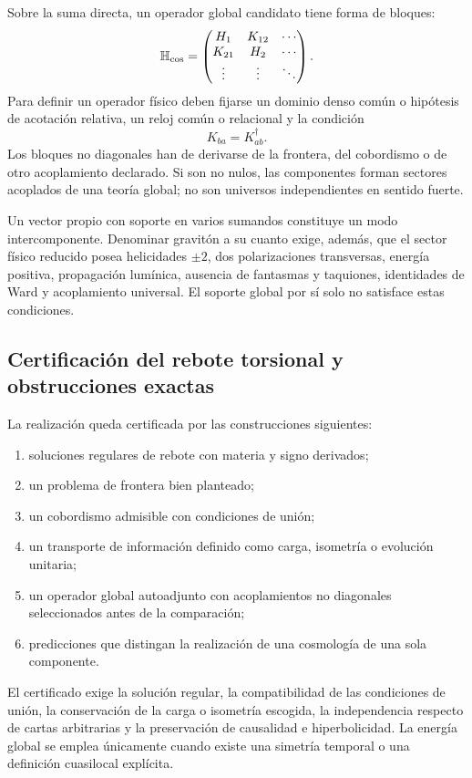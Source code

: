 Sobre la suma directa, un operador global candidato tiene forma de bloques:
\[
 \mathbb H_{\rm cos}
 =
 \begin{pmatrix}
 H_1&K_{12}&\cdots\\
 K_{21}&H_2&\cdots\\
 \vdots&\vdots&\ddots
 \end{pmatrix}.
\]
Para definir un operador físico deben fijarse un dominio denso común o
hipótesis de acotación relativa, un reloj común o relacional y la condición
\[
 K_{ba}=K_{ab}^{\dagger}.
\]
Los bloques no diagonales han de derivarse de la frontera, del cobordismo o
de otro acoplamiento declarado. Si son no nulos, las componentes forman
sectores acoplados de una teoría global; no son universos independientes en
sentido fuerte.

Un vector propio con soporte en varios sumandos constituye un modo
intercomponente. Denominar gravitón a su cuanto exige, además, que el sector
físico reducido posea helicidades \(\pm2\), dos polarizaciones transversas,
energía positiva, propagación lumínica, ausencia de fantasmas y taquiones,
identidades de Ward y acoplamiento universal. El soporte global por sí solo
no satisface estas condiciones.

\subsection{Certificación del rebote torsional y obstrucciones exactas}
\label{sec:condiciones-prueba-cosmologia-hmt}

La realización queda certificada por las construcciones siguientes:
\begin{enumerate}
 \item soluciones regulares de rebote con materia y signo derivados;
 \item un problema de frontera bien planteado;
 \item un cobordismo admisible con condiciones de unión;
 \item un transporte de información definido como carga, isometría o
 evolución unitaria;
 \item un operador global autoadjunto con acoplamientos no diagonales
 seleccionados antes de la comparación;
 \item predicciones que distingan la realización de una cosmología de una
 sola componente.
\end{enumerate}

El certificado exige la solución regular, la compatibilidad de las
condiciones de unión, la conservación de la carga o isometría escogida, la
independencia respecto de cartas arbitrarias y la preservación de causalidad
e hiperbolicidad. La energía global se emplea únicamente cuando existe una
simetría temporal o una definición cuasilocal explícita.
